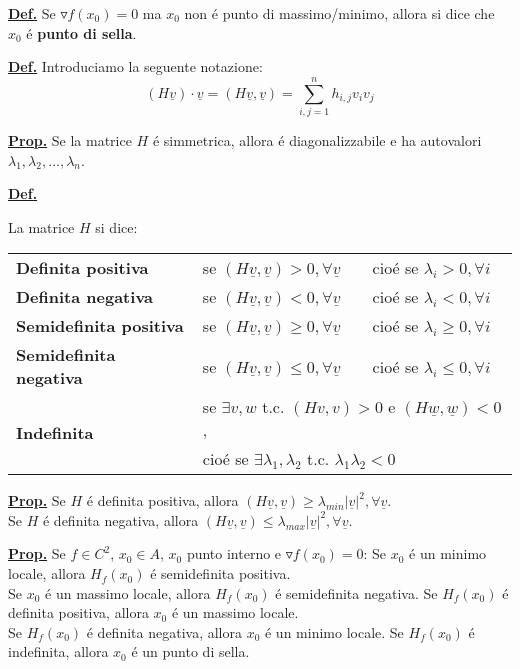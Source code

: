 \documentclass[a4paper,10pt]{article} %
\renewcommand{\b}[1]{%
    {\textbf{#1}}}
\renewcommand{\v}[1]{%
    {\underline{#1}}}
\newcommand{\ldef}[1]{%
    {\smallbreak\par\tiny\textbf{\underline{Def.}} {#1} \smallbreak}}
\newcommand{\lprop}[1]{%
    {\smallbreak\par\tiny\textbf{\underline{Prop.}} {#1} \smallbreak}}
\newcommand{\ldim}[1]{%
    {\smallbreak\par\tiny\emph{\textbf{Dimostrazione}} {#1} \par}}
\renewcommand{\ldim}[1]{{}}
\begin{document}
\begin{multicols}{6}
\ldef{
    Se $\triangledown f(x_0) = 0$ ma $x_0$ non é punto di massimo/minimo,
    allora si dice che $x_0$ é \b{punto di sella}.
}

\ldef{
    Introduciamo la seguente notazione:
    \[
        (H\v{v}) \cdot \v{v} = (H\v{v}, \v{v}) = \sum_{i,j=1}^n h_{i,j}v_iv_j
    \]
}

\lprop {
    Se la matrice $H$ é simmetrica, allora é diagonalizzabile e ha autovalori
    $\lambda_1, \lambda_2, \dots, \lambda_n$.
}

\ldef{
    La matrice $H$ si dice:\\
    \small
    \begin{tabular}{@{}lll@{}}
    \b{Definita positiva} & se $(H\v{v}, \v{v}) > 0,  \forall \v{v}$ 
        & cioé se $\lambda_i > 0, \forall i$\\
    \b{Definita negativa} & se $(H\v{v}, \v{v}) < 0,  \forall \v{v}$ 
        & cioé se $\lambda_i < 0, \forall i$\\
    \b{Semidefinita positiva} & se $(H\v{v}, \v{v}) \geq 0,  \forall \v{v}$ 
        & cioé se $\lambda_i \geq 0, \forall i$\\
    \b{Semidefinita negativa} & se $(H\v{v}, \v{v}) \leq 0,  \forall \v{v}$ 
        & cioé se $\lambda_i \leq 0, \forall i$\\
        \multirow{2}{*}{\b{Indefinita}} & \multicolumn{2}{l}{ se 
            $\exists v,w$ t.c. $(Hv,v)>0$ e $(H\v{w}, \v{w}) < 0$, }\\
        & \multicolumn{2}{l}{cioé se 
            $\exists \lambda_1, \lambda_2$ t.c. $\lambda_1 \lambda_2 < 0$}
    \end{tabular}
}

\lprop{
    \small
    Se $H$ é definita positiva, allora 
    $(H\v{v}, \v{v}) \geq \lambda_{min} |\v{v}|^2, \forall \v{v}$.\\
    Se $H$ é definita negativa, allora 
    $(H\v{v}, \v{v}) \leq \lambda_{max} |\v{v}|^2, \forall \v{v}$.
}

\lprop{
    Se $f \in C^2$, $x_0 \in A$, $x_0$ punto interno e 
    $\triangledown f(x_0)=0$:
    \small
    Se $x_0$ é un minimo locale, allora $H_f(x_0)$ é semidefinita positiva.\\
    Se $x_0$ é un massimo locale, allora $H_f(x_0)$ é semidefinita negativa.
    \ldim{
        Manca!
    }
    Se $H_f(x_0)$ é definita positiva, allora $x_0$ é un massimo locale.\\
    Se $H_f(x_0)$ é definita negativa, allora $x_0$ é un minimo locale.
    \ldim{
        Manca!
    }
    Se $H_f(x_0)$ é indefinita, allora $x_0$ é un punto di sella.
    \ldim{
        Manca!
    }
}


\end{multicols}
\end{document}
